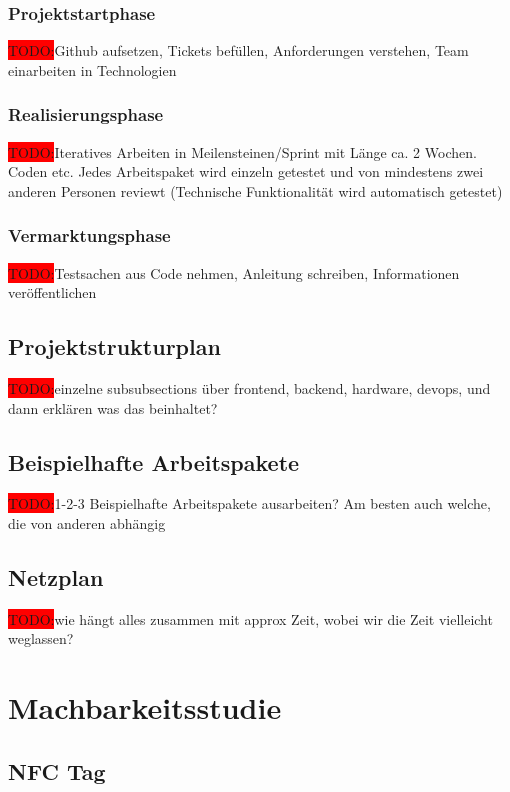 \documentclass[10pt, a4paper, draft]{article}
\begin{document}
\subsubsection{Projektstartphase}
\colorbox{red}{TODO:}Github aufsetzen, Tickets befüllen, Anforderungen verstehen, Team einarbeiten in Technologien

\subsubsection{Realisierungsphase}
\colorbox{red}{TODO:}Iteratives Arbeiten in Meilensteinen/Sprint mit Länge ca. 2 Wochen. Coden etc. Jedes Arbeitspaket wird einzeln getestet und von mindestens zwei anderen Personen reviewt (Technische Funktionalität wird automatisch getestet)

\subsubsection{Vermarktungsphase}
\colorbox{red}{TODO:}Testsachen aus Code nehmen, Anleitung schreiben, Informationen veröffentlichen

\subsection{Projektstrukturplan}
\colorbox{red}{TODO:}einzelne subsubsections über frontend, backend, hardware, devops, und dann erklären was das beinhaltet?

\subsection{Beispielhafte Arbeitspakete}
\colorbox{red}{TODO:}1-2-3 Beispielhafte Arbeitspakete ausarbeiten? Am besten auch welche, die von anderen abhängig

\subsection{Netzplan}
\colorbox{red}{TODO:}wie hängt alles zusammen mit approx Zeit, wobei wir die Zeit vielleicht weglassen?

\section{Machbarkeitsstudie}

\subsection{NFC Tag}
\end{document}
